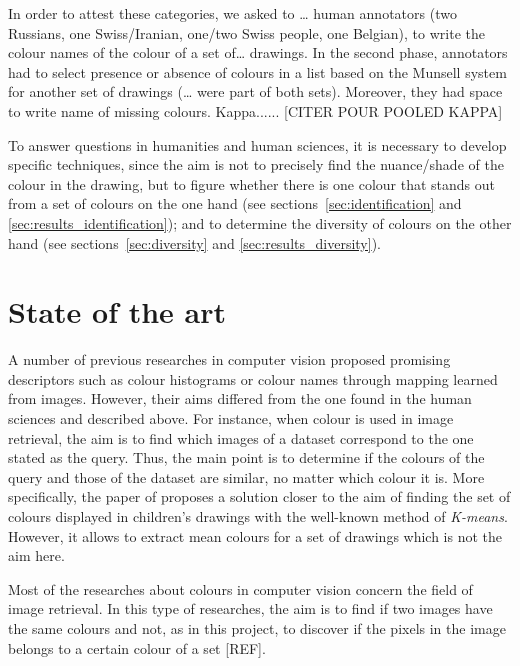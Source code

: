 \documentclass[11pt,a4paper]{article}
\begin{document}
	


In order to attest these categories, we asked to
\ldots{} human annotators (two Russians, one Swiss/Iranian, one/two
Swiss people, one Belgian), to write the colour names of the colour of a
set of\ldots{} drawings. In the second phase, annotators had to select
presence or absence of colours in a list based on the Munsell system for
another set of drawings (\ldots{} were part of both sets). Moreover,
they had space to write name of missing colours.
Kappa...... [CITER POUR POOLED KAPPA]

To answer questions in humanities and human sciences, it is necessary to develop specific
techniques, since the aim is not to precisely find the nuance/shade of the
colour in the drawing, but to figure whether there is one colour that stands
out from a set of colours on the one hand (see sections~\ref{sec:identification} and \ref{sec:results_identification}); and to determine the diversity of colours on the
other hand (see sections~\ref{sec:diversity} and \ref{sec:results_diversity}).


\section{State of the art}

A number of previous researches in computer vision proposed promising
descriptors such as colour histograms \cite{sun2006} or colour names
\cite{weijer2009, lindner2013} through mapping learned from images.
However, their aims differed from the one found in the human sciences
and described above. For instance, when colour is used in image
retrieval, the aim is to find which images of a dataset correspond to
the one stated as the query. Thus, the main point is to determine if the
colours of the query and those of the dataset are similar, no matter
which colour it is. More specifically, the paper of
\cite{konyushkova2015} proposes a solution closer to the aim of finding
the set of colours displayed in children's drawings with the well-known
method of \emph{K-means}. However, it allows to extract mean colours for
a set of drawings which is not the aim here.

Most of the researches about colours in
computer vision concern the field of image retrieval. In this type of
researches, the aim is to find if two images have the same colours and
not, as in this project, to discover if the pixels in the image belongs
to a certain colour of a set {[}REF{]}.

\cite{benavente2008}
\end{document}
